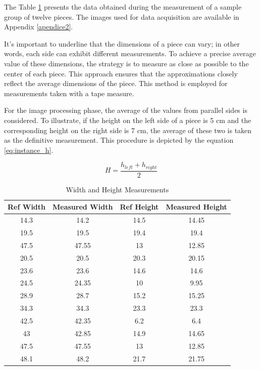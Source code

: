 The Table \ref{tab:leftovers} presents the data obtained during the measurement of a sample group of twelve pieces. The images used for data acquisition are available in Appendix \ref{apendice2}.

It's important to underline that the dimensions of a piece can vary; in other words, each side can exhibit different measurements. To achieve a precise average value of these dimensions, the strategy is to measure as close as possible to the center of each piece. This approach ensures that the approximations closely reflect the average dimensions of the piece. This method is employed for measurements taken with a tape measure.

For the image processing phase, the average of the values from parallel sides is considered. To illustrate, if the height on the left side of a piece is 5 cm and the corresponding height on the right side is 7 cm, the average of these two is taken as the definitive measurement. This procedure is depicted by the equation \eqref{eq:instance_h}.

\begin{equation}
    H = \frac{h_{left} + h_{right}}{2}
    \label{eq:instance_h}
\end{equation}

\begin{table}[h]
\centering

\begin{tabular}{c c c c}
\hline
\textbf{Ref Width} & \textbf{Measured Width} & \textbf{Ref Height} & \textbf{Measured Height} \\
\hline
 14.3 & 14.2 & 14.5 & 14.45 \\
 19.5 & 19.5 & 19.4 & 19.4 \\
47.5 & 47.55 & 13 & 12.85 \\
 20.5 & 20.5 & 20.3 & 20.15 \\
23.6 & 23.6 & 14.6 & 14.6 \\
24.5 & 24.35 & 10 & 9.95 \\
28.9 & 28.7 & 15.2 & 15.25 \\
 34.3 & 34.3 & 23.3 & 23.3 \\
42.5 & 42.35 & 6.2 & 6.4 \\
 43 & 42.85 & 14.9 & 14.65 \\
 47.5 & 47.55 & 13 & 12.85 \\
 48.1 & 48.2 & 21.7 & 21.75 \\
\hline
\end{tabular}
\caption{Width and Height Measurements}
\label{tab:leftovers}
\end{table}



